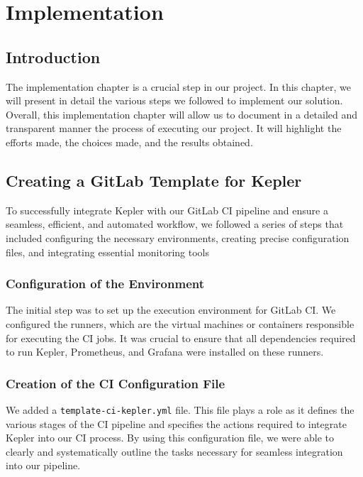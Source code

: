 \chapter{Implementation}
\label{chap:Chapter 4 title}
\section*{Introduction}

The implementation chapter is a crucial step in our project. In this chapter, we will present in detail the various steps we followed to implement our solution. Overall, this implementation chapter will allow us to document in a detailed and transparent manner the process of executing our project. It will highlight the efforts made, the choices made, and the results obtained.

\pagebreak

\section{Creating a GitLab Template for Kepler}

To successfully integrate Kepler with our GitLab CI pipeline and ensure a seamless, efficient, and automated workflow, we followed a series of steps that included configuring the necessary environments, creating precise configuration files, and integrating essential monitoring tools
\subsection*{Configuration of the Environment}

The initial step was to set up the execution environment for GitLab CI. We configured the runners, which are the virtual machines or containers responsible for executing the CI jobs. It was crucial to ensure that all dependencies required to run Kepler, Prometheus, and Grafana were installed on these runners.

\subsection*{Creation of the CI Configuration File}

We added a \texttt{template-ci-kepler.yml} file. This file plays a 
role as it defines the various stages of the CI pipeline and specifies the actions required to integrate Kepler into our CI process. By using this configuration file, we were able to clearly and systematically outline the tasks necessary for seamless integration into our pipeline.

